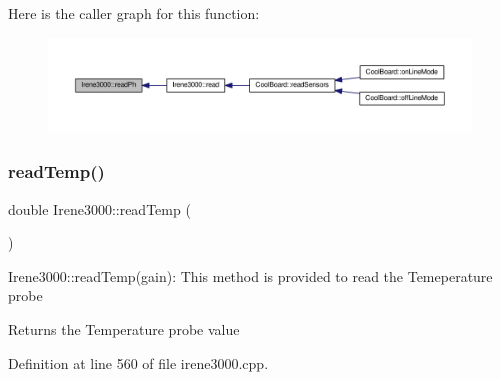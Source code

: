 Here is the caller graph for this function\+:\nopagebreak
\begin{figure}[H]
\begin{center}
\leavevmode
\includegraphics[width=350pt]{d6/d03/class_irene3000_a436fc0a06681cd0784aba56b9707f19a_icgraph}
\end{center}
\end{figure}
\mbox{\label{class_irene3000_a80bc6dfea106dc3bc54fa20204d4d5dc}} 
\subsubsection{\texorpdfstring{read\+Temp()}{readTemp()}}
{\footnotesize\ttfamily double Irene3000\+::read\+Temp (\begin{DoxyParamCaption}{ }\end{DoxyParamCaption})}

Irene3000\+::read\+Temp(gain)\+: This method is provided to read the Temeperature probe

\begin{DoxyReturn}{Returns}
the Temperature probe value 
\end{DoxyReturn}


Definition at line 560 of file irene3000.\+cpp.


